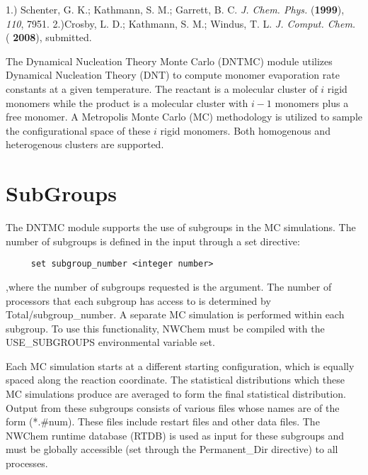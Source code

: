 
%

\label{sec:dntmc} 1.)  Schenter, G. K.; Kathmann, S. M.; Garrett, B.
C. {\it J. Chem. Phys.} ({\bf 1999}), {\it 110}, 7951. 2.)Crosby, L.
D.; Kathmann, S. M.; Windus, T. L. {\it J. Comput. Chem.} ({\bf
2008}), submitted.

 The Dynamical Nucleation Theory Monte Carlo
(DNTMC) module utilizes Dynamical Nucleation Theory (DNT) to compute
monomer evaporation rate constants at a given temperature.  The
reactant is a molecular cluster of $i$ rigid monomers while the
product is a molecular cluster with $i-1$ monomers plus a free
monomer.  A Metropolis Monte Carlo (MC) methodology is utilized to
sample the configurational space of these $i$ rigid monomers.  Both
homogenous and heterogenous clusters are supported.

\section{SubGroups}

The DNTMC module supports the use of subgroups in the MC
simulations.  The number of subgroups is defined in the input
through a set directive:
\begin{verbatim}
     set subgroup_number <integer number>
\end{verbatim}
,where the number of subgroups requested is the argument.  The
number of processors that each subgroup has access to is determined
by Total/subgroup\_number.  A separate MC simulation is performed
within each subgroup.  To use this functionality, NWChem must be
compiled with the USE\_SUBGROUPS environmental variable set.

Each MC simulation starts at a different starting configuration,
which is equally spaced along the reaction coordinate.  The
statistical distributions which these MC simulations produce are
averaged to form the final statistical distribution.  Output from
these subgroups consists of various files whose names are of the
form (*.\#num). These files include restart files and other data
files.  The NWChem runtime database (RTDB) is used as input for
these subgroups and must be globally accessible (set through the
Permanent\_Dir directive) to all processes.

